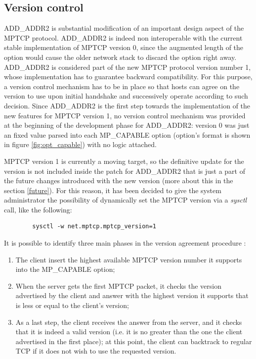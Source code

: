 \subsection{Version control}
\label{retrocomp}
ADD\_ADDR2 is substantial modification of an important design aspect of the MPTCP protocol. ADD\_ADDR2 is indeed non interoperable with the current stable implementation of MPTCP version 0, since the augmented length of the option would cause the older network stack to discard the option right away.
ADD\_ADDR2 is considered part of the new MPTCP protocol version number 1, whose implementation has to guarantee backward compatibility. For this purpose, a version control mechanism has to be in place so that hosts can agree on the version to use upon initial handshake and successively operate according to such decision. Since ADD\_ADDR2 is the first step towards the implementation of the new features for MPTCP version 1, no version control mechanism was provided at the beginning of the development phase for ADD\_ADDR2: version 0 was just an fixed value parsed into each MP\_CAPABLE option (option's format is shown in figure \ref{fig:opt_capable}) with no logic attached.

MPTCP version 1 is currently a moving target, so the definitive update for the version is not included inside the patch for ADD\_ADDR2 that is just a part of the future changes introduced with the new version (more about this in the section \ref{future}). For this reason, it has been decided to give the system administrator the possibility of dynamically set the MPTCP version via a \textit{sysctl} call, like the following:

\begin{verbatim}
        sysctl -w net.mptcp.mptcp_version=1
\end{verbatim}

It is possible to identify three main phases in the version agreement procedure \cite{rfc6824bis04}:

\begin{enumerate}
  \item The client insert the highest available MPTCP version number it supports into the MP\_CAPABLE option;
  \item When the server gets the first MPTCP packet, it checks the version advertised by the client and answer with the highest version it supports that is less or equal to the client's version;
  \item As a last step, the client receives the answer from the server, and it checks that it is indeed a valid version (i.e. it is no greater than the one the client advertised in the first place); at this point, the client can backtrack to regular TCP if it does not wish to use the requested version.
\end{enumerate}

